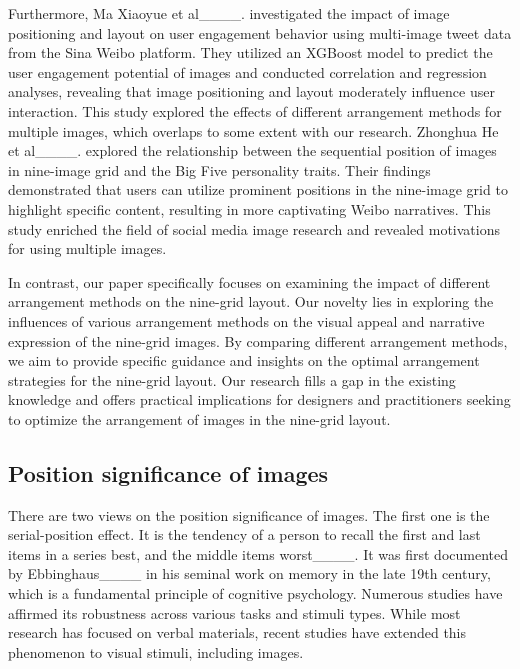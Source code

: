 Furthermore, Ma Xiaoyue et al____. investigated the impact of image positioning and layout on user engagement behavior using multi-image tweet data from the Sina Weibo platform. They utilized an XGBoost model to predict the user engagement potential of images and conducted correlation and regression analyses, revealing that image positioning and layout moderately influence user interaction. This study explored the effects of different arrangement methods for multiple images, which overlaps to some extent with our research. Zhonghua He et al____. explored the relationship between the sequential position of images in nine-image grid and the Big Five personality traits. Their findings demonstrated that users can utilize prominent positions in the nine-image grid to highlight specific content, resulting in more captivating Weibo narratives. This study enriched the field of social media image research and revealed motivations for using multiple images.

In contrast, our paper specifically focuses on examining the impact of different arrangement methods on the nine-grid layout. Our novelty lies in exploring the influences of various arrangement methods on the visual appeal and narrative expression of the nine-grid images. By comparing different arrangement methods, we aim to provide specific guidance and insights on the optimal arrangement strategies for the nine-grid layout. Our research fills a gap in the existing knowledge and offers practical implications for designers and practitioners seeking to optimize the arrangement of images in the nine-grid layout.

\subsection{Position significance of images}

There are two views on the position significance of images. The first one is the serial-position effect. It is the tendency of a person to recall the first and last items in a series best, and the middle items worst____. It was first documented by Ebbinghaus____ in his seminal work on memory in the late 19th century, which is a fundamental principle of cognitive psychology. Numerous studies have affirmed its robustness across various tasks and stimuli types. While most research has focused on verbal materials, recent studies have extended this phenomenon to visual stimuli, including images.

